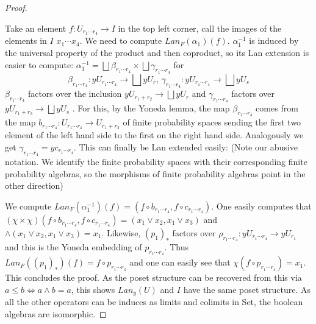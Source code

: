 \documentclass[a4paper]{amsproc}
\theoremstyle{plain}
\theoremstyle{definition}
\theoremstyle{remark}
\numberwithin{equation}{section}
\begin{document}
\begin{proof}
\begin{center}
\begin{tikzcd}
\end{tikzcd}
\end{center}
Take an element $f:U_{r_1\cdots r_4}\rightarrow I$ in the top left corner, call the images of the elements in $I$ $x_1\cdots x_4$. We need to compute $Lan_F(\alpha_1)(f)$. %
$\alpha^{-1}_1$ is induced by the universal property of the product and then coproduct, so its Lan extension is easier to compute: $\alpha^{-1}_1=\bigsqcup \beta_{r_1\cdots r_4}\times \bigsqcup \gamma_{r_1\cdots r_4}$ for
\[\beta_{r_1\cdots r_4}:yU_{r_1\cdots r_4}\rightarrow \bigsqcup yU_r, \, \gamma_{r_1\cdots r_4}:yU_{r_1\cdots r_4}\rightarrow \bigsqcup yU_s\]
$\beta_{r_1\cdots r_4}$ factors over the inclusion $yU_{r_1+r_2}\rightarrow \bigsqcup yU_r$ and $\gamma_{r_1\cdots r_4}$ factors over $yU_{r_1+r_3}\rightarrow \bigsqcup yU_s$ . For this, by the Yoneda lemma, the map $\beta_{r_1\cdots r_4}$ comes from the map $b_{r_1\cdots r_4}:U_{r_1\cdots r_4}\rightarrow U_{r_1+r_2}$ of finite probability spaces sending the first two element of the left hand side to the first on the right hand side. Analogously we get $\gamma_{r_1\cdots r_4}=yc_{r_1\cdots r_4}$. This can finally be Lan extended easily: (Note our abusive notation. We identify the finite probability spaces with their corresponding finite probability algebras, so the morphisms of finite probability algebras point in the other direction)
\begin{center}
\end{center}
We compute $Lan_F(\alpha^{-1}_1)(f)=(f\circ b_{r_1\cdots r_4}, f\circ c_{r_1\cdots r_4})$. One easily computes that $(\chi\times \chi)(f\circ b_{r_1\cdots r_4}, f\circ c_{r_1\cdots r_4})=(x_1\vee x_2, x_1\vee x_3)$ and $\wedge (x_1\vee x_2, x_1\vee x_3) = x_1$.\newline
\indent Likewise, $(p_1)_*$ factors over $\rho_{r_1\cdots r_4}:yU_{r_1\cdots r_4}\rightarrow yU_{r_1}$ and this is the Yoneda embedding of $p_{r_1\cdots r_4}$. Thus $Lan_F((p_1)_*)(f)=f\circ p_{r_1\cdots r_4}$ and one can easily see that $\chi(f\circ p_{r_1\cdots r_4})=x_1$. This concludes the proof. As the poset structure can be recovered from this via $a\leq b\iff a\wedge b=a$, this shows $Lan_y(U)$ and $I$ have the same poset structure. As all the other operators can be induces as limits and colimits in Set, the boolean algebras are isomorphic.


\end{proof}
\end{document}
